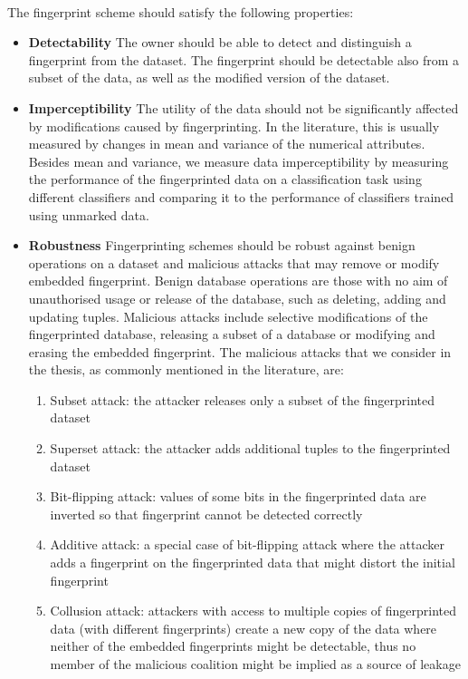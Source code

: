 \paragraph{}
The fingerprint scheme should satisfy the following properties:
\begin{itemize}
    \item[] \textbf{Detectability} The owner should be able to detect and distinguish a fingerprint from the dataset.
    The fingerprint should be detectable also from a subset of the data, as well as the modified version of the dataset.
    \item[] \textbf{Imperceptibility} The utility of the data should not be significantly affected by modifications caused by fingerprinting. 
    In the literature, this is usually measured by changes in mean and variance of the numerical attributes. 
    Besides mean and variance, we measure data imperceptibility by measuring the performance of the fingerprinted data on a classification task using different classifiers and comparing it to the performance of classifiers trained using unmarked data. 
    \item[] \textbf{Robustness} Fingerprinting schemes should be robust against benign operations on a dataset and malicious attacks that may remove or modify embedded fingerprint. 
Benign database operations are those with no aim of unauthorised usage or release of the database, such as deleting, adding and updating tuples. 
Malicious attacks include selective modifications of the fingerprinted database, releasing a subset of a database or modifying and erasing the embedded fingerprint. 
The malicious attacks that we consider in the thesis, as commonly mentioned in the literature, are:
\begin{enumerate}
    \item Subset attack: the attacker releases only a subset of the fingerprinted dataset
    \item Superset attack: the attacker adds additional tuples to the fingerprinted dataset
    \item Bit-flipping attack: values of some bits in the fingerprinted data are inverted so that fingerprint cannot be detected correctly
    \item Additive attack: a special case of bit-flipping attack where the attacker adds a fingerprint on the fingerprinted data that might distort the initial fingerprint
    \item Collusion attack: attackers with access to multiple copies of fingerprinted data (with different fingerprints) create a new copy of the data where neither of the embedded fingerprints might be detectable, thus no member of the malicious coalition might be implied as a source of leakage
\end{enumerate}
\end{itemize}
